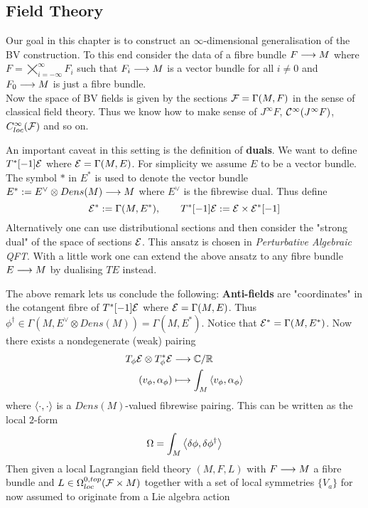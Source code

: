 \subsection{Field Theory}
Our goal in this chapter is to construct an $\infty$-dimensional generalisation of the BV construction. To this end consider the data of a fibre bundle $F \longrightarrow M$ where $F = \bigtimes_{i = - \infty}^{\infty} F_i$ such that $F_i \longrightarrow M$ is a vector bundle for all $i \neq 0$ and $F_0 \longrightarrow M$ is just a fibre bundle.\\
Now the space of BV fields is given by the sections ${\mathcal{F}} = \Gamma(M, F)$ in the sense of classical field theory. Thus we know how to make sense of $J^\infty F$, $\mathcal{C}^{\infty}(J^\infty F)$, $C_{loc}^\infty({\mathcal{F}})$ and so on.

\begin{rem}
  An important caveat in this setting is the definition of \textbf{duals}. We want to define $T^*[-1] {\mathcal{E}}$ where ${\mathcal{E}} = \Gamma(M, E)$. For simplicity we assume $E$ to be a vector bundle. The symbol $*$ in $E^*$ is used to denote the vector bundle $E^* := E^\vee \otimes Dens(M) \longrightarrow M$ where $E^\vee$ is the fibrewise dual. Thus define
  \begin{equation}
    {\mathcal{E}}^* := \Gamma(M, E^*), \quad \quad T^*[-1]{\mathcal{E}} := {\mathcal{E}} \times {\mathcal{E}}^*[-1]
  \end{equation}
  Alternatively one can use distributional sections and then consider the "strong dual" of the space of sections ${\mathcal{E}}$. This ansatz is chosen in \emph{Perturbative Algebraic QFT}. With a little work one can extend the above ansatz to any fibre bundle $E \longrightarrow M$ by dualising $TE$ instead.
\end{rem}

The above remark lets us conclude the following: \textbf{Anti-fields} are "coordinates" in the cotangent fibre of $T^*[-1]{\mathcal{E}}$ where ${\mathcal{E}} = \Gamma(M, E)$. Thus $\phi^\dagger \in \Gamma(M, E^\vee \otimes Dens(M)) = \Gamma(M, E^*)$. Notice that ${\mathcal{E}}^* = \Gamma(M, E^*)$. Now there exists a nondegenerate (weak) pairing
\begin{align}
  T_\phi \EE \otimes T^*_\phi \EE &\lra \CC/\RR \\
  (v_\phi, \alpha_\phi) &\lmap \int_M \pair{v_\phi}{\alpha_\phi}
\end{align}
where $\left\langle \cdot , \cdot \right\rangle$ is a $Dens(M)$-valued fibrewise pairing. This can be written as the local $2$-form
\begin{equation}
  \Omega = \int_M \pair{\delta \phi}{\delta \phi^\dagger}
\end{equation}
Then given a local Lagrangian field theory $(M, F, L)$ with $F \longrightarrow M$ a fibre bundle and $L \in \Omega_{loc}^{0,top}({\mathcal{F}} \times M)$ together with a set of local symmetries $\{V_a\}$ for now assumed to originate from a Lie algebra action

